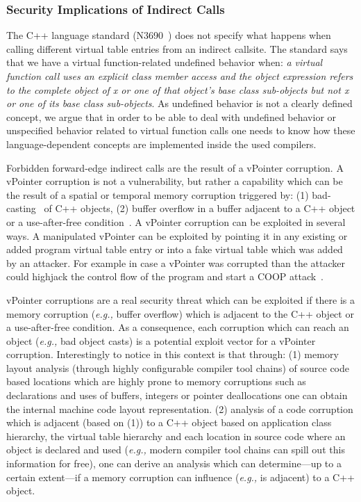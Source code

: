 \subsubsection{Security Implications of Indirect Calls}
\label{Security Implications of Forbidden Forward Indirect Calls}
The C++ language standard (N3690~\cite{iso:iecN3690}) does not specify what happens when calling different virtual table entries from an indirect callsite. 
The standard says that we have a virtual function-related undefined behavior when: \textit{a virtual function call uses an explicit class member access and 
the object expression refers to the complete object of x or one of that object's base class sub-objects but not x or one of its base class sub-objects}. As 
undefined behavior is not a clearly defined concept, we argue that in order to be able to deal with undefined behavior or unspecified behavior related to 
virtual function calls one needs to know how these language-dependent concepts are implemented inside the used compilers.

Forbidden forward-edge indirect calls are the result of a vPointer corruption. A vPointer corruption is not a vulnerability, but rather a capability which
can be the result of a spatial or temporal memory corruption triggered by: 
(1) bad-casting~\cite{byoungyoung:typecasting} of C++ objects, 
(2) buffer overflow in a buffer adjacent to a C++ object or a use-after-free condition~\cite{schuster:coop}.
A vPointer corruption can be exploited in several ways. A manipulated vPointer can be exploited by pointing it in any existing or added program virtual 
table entry or into a fake virtual table which was added by an attacker. For example in case a vPointer
was corrupted than the attacker could highjack the control flow of the program and start a COOP attack~\cite{schuster:coop}.

vPointer corruptions are a real security threat which can be exploited if there is a memory corruption (\textit{e.g.,} buffer overflow) which is adjacent 
to the C++ object or a use-after-free condition. As a consequence, each corruption which can reach an object (\textit{e.g.,} bad object casts) is a potential
exploit vector for a vPointer corruption. Interestingly to notice in this context is that through:
(1) memory layout analysis (through highly configurable compiler tool chains) of source code based locations which are highly prone to memory corruptions such 
as declarations and uses of buffers, integers or pointer deallocations one can obtain the internal machine code layout representation.
(2) analysis of a code corruption which is adjacent (based on (1)) to a C++ object based on application class hierarchy, the virtual table hierarchy and each
location in source code where an object is declared and used (\textit{e.g.,} modern compiler tool chains can spill out this information for free), one can 
derive an analysis which can determine---up to a certain extent---if a memory corruption can influence (\textit{e.g.,} is adjacent) to a C++ object.


